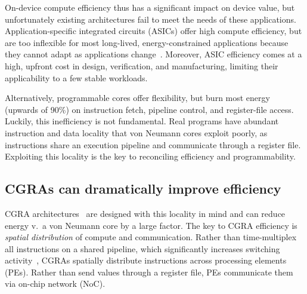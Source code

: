 On-device compute efficiency thus has a significant impact on device
value, but unfortunately existing architectures fail to meet the needs
of these applications.
%
Application-specific integrated circuits (ASICs) offer high compute
efficiency, but are too inflexible for most long-lived, 
energy-constrained applications because they cannot adapt as
applications change~\cite{hotmobile2021}.
%
Moreover, ASIC efficiency comes at a high, upfront cost in design,
verification, and manufacturing, limiting their applicability to a few
stable workloads.

Alternatively, programmable cores offer flexibility, but burn most energy
(upwards of 90\%)
on instruction fetch, pipeline control, and register-file access.
%
Luckily, this inefficiency is not fundamental.
%
Real programs have abundant instruction and data locality that von
Neumann cores exploit poorly, as instructions share an execution
pipeline and communicate through a register file.
%
%
Exploiting this locality is the key to reconciling efficiency and programmability.



\subsection{CGRAs can dramatically improve efficiency}

CGRA architectures~\cite{remarc,adres,matrix,dyser,revamp,opencgra,cgrame,wave,nguyen2021fifer,morphosys,mozart,ppa,fpca,plasticine,dadu2019towards,parashar2013triggered,capstan,nowatzki:isca17:stream-dataflow,goldstein2000piperench,trips,weng2020dsagen,weng2020hybrid,voitsechov2014single,mishra2006tartan,tan2018stitch,karunaratne2017hycube,voitsechov2018inter,evx,torng2021ultra}
are designed with this locality in mind and
can reduce energy v.\ a von Neumann core by a large factor.
%
The key to CGRA efficiency is \emph{spatial distribution} of compute and communication.
%
Rather than time-multiplex all instructions on a shared pipeline,
which significantly increases switching activity~\cite{snafu},
CGRAs spatially distribute instructions across processing elements (PEs).
%
Rather than send values through a register file,
PEs communicate them via on-chip network (NoC).

